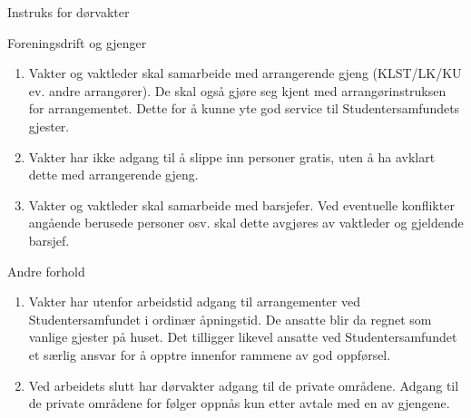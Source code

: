 \documentclass[fsbok.tex]{subfiles}
\begin{document}
\begin{instruks*}{Instruks for dørvakter}
    \begin{instruksledd}{Foreningsdrift og gjenger}
        \begin{enumerate}
            \item Vakter og vaktleder skal samarbeide med arrangerende gjeng (KLST/LK/KU ev. andre arrangører). De skal
                også gjøre seg kjent med arrangørinstruksen for arrangementet. Dette for å kunne yte god service til
                Studentersamfundets gjester.
            \item Vakter har ikke adgang til å slippe inn personer gratis, uten å ha avklart dette med arrangerende gjeng.
            \item Vakter og vaktleder skal samarbeide med barsjefer. Ved eventuelle konflikter angående berusede personer
                osv. skal dette avgjøres av vaktleder og gjeldende barsjef.
        \end{enumerate}    
    \end{instruksledd}

    \begin{instruksledd}{Andre forhold}
        \begin{enumerate}
            \item Vakter har utenfor arbeidstid adgang til arrangementer ved Studentersamfundet i ordinær åpningstid. De
                ansatte blir da regnet som vanlige gjester på huset. Det tilligger likevel ansatte ved Studentersamfundet et
                særlig ansvar for å opptre innenfor rammene av god oppførsel.
            \item Ved arbeidets slutt har dørvakter adgang til de private områdene. Adgang til de private områdene for følger
                oppnås kun etter avtale med en av gjengene. 
        \end{enumerate}
    \end{instruksledd}
\end{instruks*}
\end{document}
